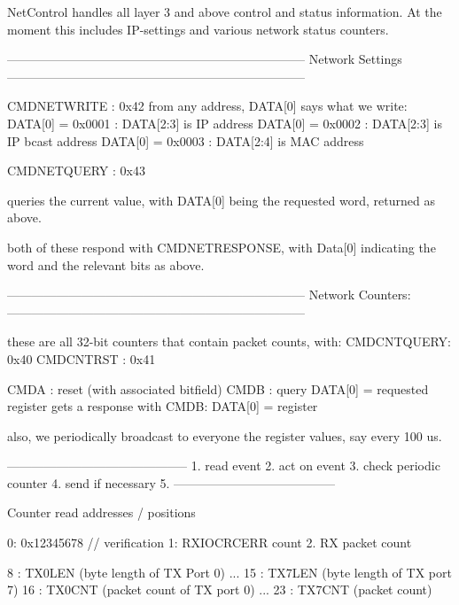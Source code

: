 NetControl handles all layer 3 and above control and status
information. At the moment this includes IP-settings and various
network status counters.

------------------------------------------------------------------------
Network Settings
------------------------------------------------------------------------

CMDNETWRITE : 0x42
from any address, DATA[0] says what we write:
    DATA[0] = 0x0001 : DATA[2:3] is IP address
    DATA[0] = 0x0002 : DATA[2:3] is IP bcast address
    DATA[0] = 0x0003 : DATA[2:4] is MAC address

CMDNETQUERY : 0x43

queries the current value, with DATA[0] being the requested word,
returned as above.

both of these respond with CMDNETRESPONSE, with Data[0] indicating
the word and the relevant bits as above. 

------------------------------------------------------------------------
Network Counters:
------------------------------------------------------------------------

these are all 32-bit counters that contain packet counts, with: 
CMDCNTQUERY: 0x40
CMDCNTRST : 0x41

CMDA : reset (with associated bitfield)
CMDB : query DATA[0] = requested register
   gets a response with 
   CMDB: DATA[0] = register

   also, we periodically broadcast to everyone the register values,
   say every 100 us.


--------------------------------------------
1. read event
2. act on event
3. check periodic counter
4. send if necessary
5. 
---------------------------------------

Counter read addresses / positions

0: 0x12345678 // verification
1: RXIOCRCERR count
2. RX packet count

8 : TX0LEN (byte length of TX Port 0)
...
15 : TX7LEN (byte length of TX port 7)
16 : TX0CNT (packet count of TX port 0)
...
23 : TX7CNT (packet count)
